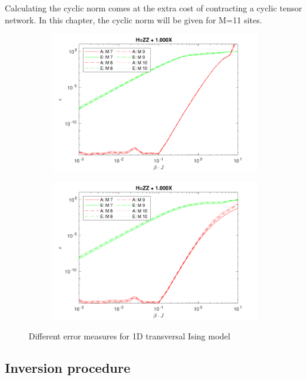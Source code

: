 Calculating the cyclic norm comes at the extra cost of contracting a cyclic tensor network. In this chapter, the cyclic norm will be given for M=11 sites.

\begin{figure}
  \begin{subfigure}[]{\linewidth}
    \includegraphics[width=\textwidth]{Figuren/benchmarking/comp_M_cycl.pdf}
  \end{subfigure}
  \begin{subfigure}[]{\linewidth}
    \includegraphics[width=\textwidth]{Figuren/benchmarking/Comp_M_lin.pdf}
  \end{subfigure}
  \caption{ Different error measures for 1D transversal Ising model }
  \label{benchmarking:systemsize}
\end{figure}

\subsection{Inversion procedure}\label{subsec:inversion_procedure}

